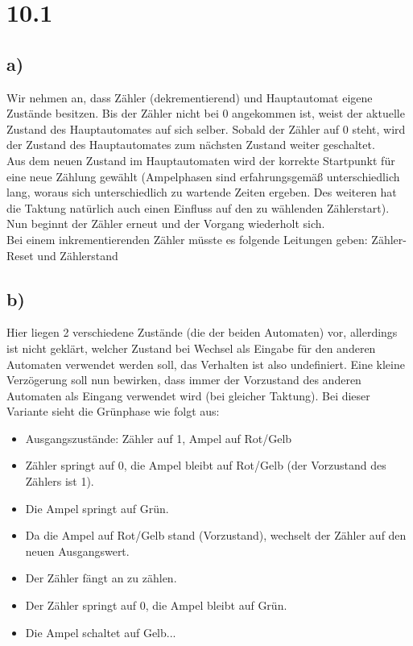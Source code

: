 \documentclass[a4paper]{scrartcl}
\title{\titleinfo}
\author{Tronje Krabbe 6435002, The-Vinh Jackie Huynh 6388888,\\Arne Struck 6326505}
\date{\today}
\begin{document}
\maketitle
\notag
\section{10.1}
	
	\subsection{a)}
		Wir nehmen an, dass Zähler (dekrementierend) und Hauptautomat eigene Zustände besitzen. Bis 
		der Zähler nicht bei 0 angekommen ist, weist der aktuelle Zustand des Hauptautomates auf 
		sich selber. Sobald der Zähler auf 0 steht, wird der Zustand des Hauptautomates zum nächsten 
		Zustand	weiter geschaltet. \\
		Aus dem neuen Zustand im Hauptautomaten wird der korrekte Startpunkt für eine neue Zählung 
		gewählt (Ampelphasen sind erfahrungsgemäß unterschiedlich lang, woraus sich unterschiedlich 
		zu 	wartende Zeiten ergeben. Des weiteren hat die Taktung natürlich auch einen Einfluss auf 
		den zu 	wählenden Zählerstart). Nun beginnt der Zähler erneut und der Vorgang wiederholt 
		sich. \\
		Bei einem inkrementierenden Zähler müsste es folgende Leitungen geben: Zähler-Reset und 
		Zählerstand \\


	\subsection{b)}
		Hier liegen 2 verschiedene Zustände (die der beiden Automaten) vor, allerdings ist nicht 
		geklärt, welcher Zustand bei Wechsel als Eingabe für den anderen Automaten verwendet werden
		soll, das Verhalten ist also undefiniert. Eine kleine Verzögerung soll nun bewirken, dass
		immer der Vorzustand des anderen Automaten als Eingang verwendet wird (bei gleicher 
		Taktung). Bei dieser Variante sieht die Grünphase wie folgt aus:
		\begin{itemize}
			\item Ausgangszustände: Zähler auf 1, Ampel auf Rot/Gelb 
			\item Zähler springt auf 0, die Ampel bleibt auf Rot/Gelb (der Vorzustand des Zählers 
			ist 1).
		 	\item Die Ampel springt auf Grün. 
		 	\item Da die Ampel auf Rot/Gelb stand (Vorzustand), wechselt der Zähler auf den neuen 
		 	Ausgangswert. 
		 	\item Der Zähler fängt an zu zählen. 
		 	\item Der Zähler springt auf 0, die Ampel bleibt auf Grün. 
		 	\item Die Ampel schaltet auf Gelb...  
		\end{itemize}
		
\end{document}
